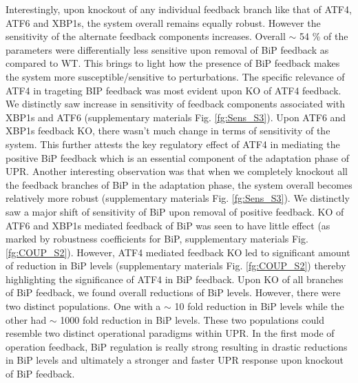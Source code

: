 \documentclass[fleqn,10pt]{wlscirep}
\begin{document}
Interestingly, upon knockout of any individual feedback branch like that of ATF4, ATF6 and XBP1s, the system overall remains equally robust. However the sensitivity of the alternate feedback components increases. Overall $\sim$ 54 \% of the parameters were differentially less sensitive upon removal of BiP feedback as compared to WT. This brings to light how the presence of BiP feedback makes the system more susceptible/sensitive to perturbations. The specific relevance of ATF4 in trageting BIP feedback was most evident upon KO of ATF4 feedback. We distinctly saw increase in sensitivity of feedback components associated with XBP1s and ATF6 (supplementary materials Fig. \ref{fg:Sens_S3}). Upon ATF6 and XBP1s feedback KO, there wasn't much change in terms of sensitivity of the system. This further attests the key regulatory effect of ATF4 in mediating the positive BiP feedback which is an essential component of the adaptation phase of UPR. Another interesting observation was that when we completely knockout all the feedback branches of BiP in the adaptation phase, the system overall becomes relatively more robust (supplementary materials Fig. \ref{fg:Sens_S3}). We distinctly saw a major shift of sensitivity of BiP upon removal of positive feedback. KO of ATF6 and XBP1s mediated feedback of BiP was seen to have little effect (as marked by robustness coefficients for BiP, supplementary materials Fig. \ref{fg:COUP_S2}). However, ATF4 mediated feedback KO led to significant amount of reduction in BiP levels (supplementary materials Fig. \ref{fg:COUP_S2}) thereby highlighting the significance of ATF4 in BiP feedback. Upon KO of all branches of BiP feedback, we found overall reductions of BiP levels. However, there were two distinct populations. One with a $\sim$ 10 fold reduction in BiP levels while the other had $\sim$ 1000 fold reduction in BiP levels. These two populations could resemble two distinct operational paradigms within UPR. In the first mode of operation feedback, BiP regulation is really strong resulting in drastic reductions in BiP levels and ultimately a stronger and faster UPR response upon knockout of BiP feedback.
\end{document}
